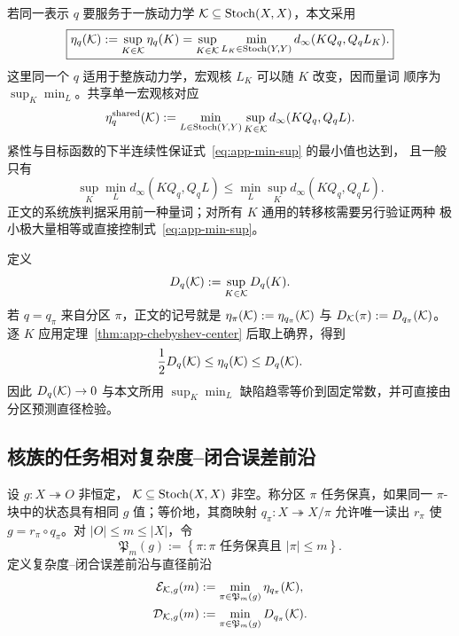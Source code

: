 若同一表示 $q$ 要服务于一族动力学 $\mathcal K\subseteq\operatorname{Stoch}(X,X)$，本文采用
\begin{equation}
 \boxed{
 \eta_q(\mathcal K)
 :=\sup_{K\in\mathcal K}\eta_q(K)
 =\sup_{K\in\mathcal K}\min_{L_K\in\operatorname{Stoch}(Y,Y)}
 d_\infty(KQ_q,Q_qL_K).}
 \label{eq:app-sup-min}
\end{equation}
这里同一个 $q$ 适用于整族动力学，宏观核 $L_K$ 可以随 $K$ 改变，因而量词
顺序为\emph{$\sup_K\min_L$}。共享单一宏观核对应
\begin{equation}
 \eta_q^{\mathrm{shared}}(\mathcal K)
 :=\min_{L\in\operatorname{Stoch}(Y,Y)}\sup_{K\in\mathcal K}
 d_\infty(KQ_q,Q_qL).
 \label{eq:app-min-sup}
\end{equation}
紧性与目标函数的下半连续性保证式~\eqref{eq:app-min-sup} 的最小值也达到，
且一般只有
\begin{equation}
  \sup_K\min_L d_\infty(KQ_q,Q_qL)
  \le
  \min_L\sup_K d_\infty(KQ_q,Q_qL).
  \label{eq:app-minimax-order}
\end{equation}
正文的系统族判据采用前一种量词；对所有 $K$ 通用的转移核需要另行验证两种
极小极大量相等或直接控制式~\eqref{eq:app-min-sup}。

定义
\begin{equation}
  D_q(\mathcal K):=\sup_{K\in\mathcal K}D_q(K).
  \label{eq:app-family-diameter}
\end{equation}
若 $q=q_\pi$ 来自分区 $\pi$，正文的记号就是
$\eta_\pi(\mathcal K):=\eta_{q_\pi}(\mathcal K)$ 与
$D_{\mathcal K}(\pi):=D_{q_\pi}(\mathcal K)$。
逐 $K$ 应用定理~\ref{thm:app-chebyshev-center} 后取上确界，得到
\begin{equation}
  \frac12D_q(\mathcal K)\le\eta_q(\mathcal K)\le D_q(\mathcal K).
  \label{eq:app-family-diameter-radius}
\end{equation}
因此 $D_q(\mathcal K)\to0$ 与本文所用
$\sup_K\min_L$ 缺陷趋零等价到固定常数，并可直接由分区预测直径检验。

\subsection{核族的任务相对复杂度--闭合误差前沿}

设 $g:X\twoheadrightarrow O$ 非恒定，
$\mathcal K\subseteq\operatorname{Stoch}(X,X)$ 非空。称分区 $\pi$ 任务保真，如果同一
$\pi$-块中的状态具有相同 $g$ 值；等价地，其商映射
$q_\pi:X\twoheadrightarrow X/\pi$ 允许唯一读出 $r_\pi$ 使
$g=r_\pi\circ q_\pi$。对 $|O|\le m\le|X|$，令
\[
 \mathfrak P_m(g):=
 \left\{\pi:\pi\text{ 任务保真且 }|\pi|\le m\right\}.
\]
定义复杂度--闭合误差前沿与直径前沿
\begin{align}
  \mathcal E_{\mathcal K,g}(m)
  &:=\min_{\pi\in\mathfrak P_m(g)}\eta_{q_\pi}(\mathcal K),
  \label{eq:app-complexity-error-curve}\\
  \mathcal D_{\mathcal K,g}(m)
  &:=\min_{\pi\in\mathfrak P_m(g)}D_{q_\pi}(\mathcal K).
  \label{eq:app-diameter-frontier}
\end{align}

